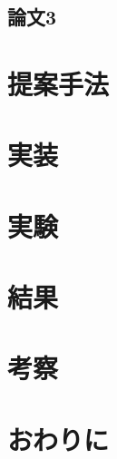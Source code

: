 \documentclass[a4paper,12pt]{jreport}
\begin{document}
\section{論文3}

\chapter{提案手法}

\chapter{実装}

\chapter{実験}

\chapter{結果}

\chapter{考察}

\chapter{おわりに}
\end{document}
